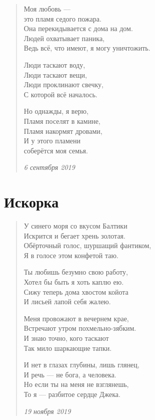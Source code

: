 \documentclass[a4paper,12pt,fleqn]{book}\usepackage{polyglossia}\setdefaultlanguage[babelshorthands=true]{russian}\setotherlanguage{english}\defaultfontfeatures{Ligatures=TeX,Mapping=tex-text}\usepackage{xcolor}\newcommand{\ml}[3]{#2}
\begin{document}
\begin{verse}
Моя любовь ---\\
это пламя седого пожара.\\
Она перекидывается с дома на дом.\\
Людей охватывает паника,\\
Ведь всё, что имеют, я могу уничтожить.

Люди таскают воду,\\
Люди таскают вещи,\\
Люди проклинают свечку,\\
С которой всё началось.

Но однажды, я верю,\\
Пламя поселят в камине,\\
Пламя накормят дровами,\\
И у этого пламени\\
соберётся моя семья.

\emph{6 сентября 2019}
\end{verse}
\newpage

\section{Искорка}

\begin{verse}
У синего моря со вкусом Балтики\\
Искрится и бегает хрень золотая.\\
Обёрточный голос, шуршащий фантиком,\\
Я в голосе этом конфетой таю.

Ты любишь безумно свою работу,\\
Хотел бы быть я хоть каплю ею.\\
Сижу теперь дома хвостом койота\\
И лисьей лапой себя жалею.

Меня провожают в вечернем крае,\\
Встречают утром похмельно-зябким.\\
И знаю точно, кого таскают\\
Так мило шаркающие тапки.

И нет в глазах глубины, лишь глянец,\\
И речь --- не бога, а человека.\\
Но если ты на меня не взглянешь,\\
То я --- разбитое сердце Джека.

\emph{19 ноября 2019}
\end{verse} 
\newpage
\end{document}
